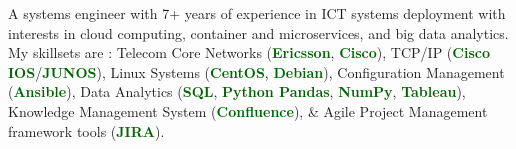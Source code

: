 
\begin{cvparagraph}

A systems engineer with 7+ years of experience in ICT systems deployment with interests in cloud computing, container and microservices, and big data analytics. My skillsets are : Telecom Core Networks (\textcolor{darkgreen}{\textbf{Ericsson}}, \textcolor{darkgreen}{\textbf{Cisco}}), TCP/IP (\textcolor{darkgreen}{\textbf{Cisco IOS}}/\textcolor{darkgreen}{\textbf{JUNOS}}), Linux Systems (\textcolor{darkgreen}{\textbf{CentOS}}, \textcolor{darkgreen}{\textbf{Debian}}), Configuration Management (\textcolor{darkgreen}{\textbf{Ansible}}), Data Analytics (\textcolor{darkgreen}{\textbf{SQL}}, \textcolor{darkgreen}{\textbf{Python Pandas}}, \textcolor{darkgreen}{\textbf{NumPy}}, \textcolor{darkgreen}{\textbf{Tableau}}), Knowledge Management System (\textcolor{darkgreen}{\textbf{Confluence}}), \& Agile Project Management framework tools (\textcolor{darkgreen}{\textbf{JIRA}}). 
\end{cvparagraph}
